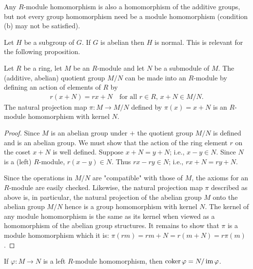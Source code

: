     \begin{note}
        Any $R$-module homomorphism is also a homomorphism of the additive groups, but not every group homomorphism need be a module homomorphism (condition (b) may not be satisfied).
    \end{note}

    \begin{note}
        Let $H$ be a subgroup of $G$. If $G$ is abelian then $H$ is normal. This is relevant for the following proposition.
    \end{note}

    \begin{proposition}
        Let $R$ be a ring, let $M$ be an $R$-module and let $N$ be a submodule of $M$. The (additive, abelian) quotient group $M/N$ can be made into an $R$-module by defining an action of elements of $R$ by
            \begin{equation*}
            \begin{split}
                r(x+N) = rx + N \quad \text{for all $r \in R$, $x + N \in M/N$}.
            \end{split}
            \end{equation*}
        The natural projection map $\pi:M \rightarrow M/N$ defined by $\pi(x) = x +N$ is an $R$-module homomorphism with kernel $N$.
    \end{proposition}
    \begin{proof}
        Since $M$ is an abelian group under $+$ the quotient group $M/N$ is defined and is an abelian group. We must show that the action of the ring element $r$ on the coset $x + N$ is well defined. Suppose $x + N = y+ N$; i.e., $x-y \in N$. Since $N$ is a (left) $R$-module, $r(x-y) \in N$. Thus $rx-ry \in N$; i.e., $rx + N = ry + N$.

        Since the operations in $M/N$ are "compatible" with those of $M$, the axioms for an $R$-module are easily checked. Likewise, the natural projection map $\pi$ described as above is, in particular, the natural projection of the abelian group $M$ onto the abelian group $M/N$ hence is a group homomorphism with kernel $N$. The kernel of any module homomorphism is the same as its kernel when viewed as a homomorphism of the abelian group structures. It remains to show that $\pi$ is a module homomorphism \textemdash which it is: $\pi(rm) = rm + N = r(m+N) = r\pi(m)$.
    \end{proof}

    \begin{definition}
        If $\varphi:M \rightarrow N$ is a left $R$-module homomorphism, then \newline $\operatorname{coker}{\varphi} = N/ \operatorname{im}{\varphi}$.
    \end{definition}
    
